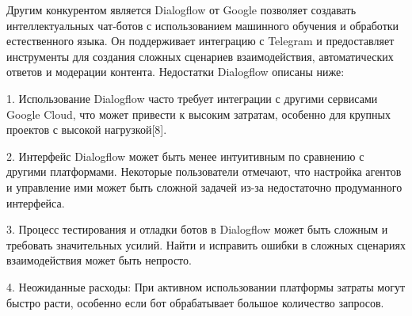 Другим конкурентом является Dialogflow от Google позволяет создавать интеллектуальных чат-ботов с использованием машинного обучения и обработки естественного языка. Он поддерживает интеграцию с Telegram и предоставляет инструменты для создания сложных сценариев взаимодействия, автоматических ответов и модерации контента. Недостатки Dialogflow описаны ниже:

1.	Использование Dialogflow часто требует интеграции с другими сервисами Google Cloud, что может привести к высоким затратам, особенно для крупных проектов с высокой нагрузкой[8]. 

2.	Интерфейс Dialogflow может быть менее интуитивным по сравнению с другими платформами. Некоторые пользователи отмечают, что настройка агентов и управление ими может быть сложной задачей из-за недостаточно продуманного интерфейса. 

3.	Процесс тестирования и отладки ботов в Dialogflow может быть сложным и требовать значительных усилий. Найти и исправить ошибки в сложных сценариях взаимодействия может быть непросто.
 
4.	Неожиданные расходы: При активном использовании платформы затраты могут быстро расти, особенно если бот обрабатывает большое количество запросов.


 
